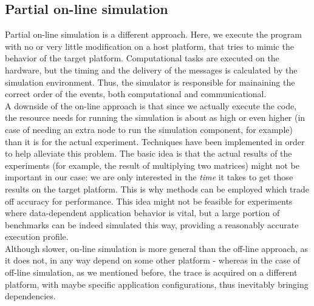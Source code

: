 \subsection{Partial on-line simulation}
Partial on-line simulation is a different approach. Here, we execute
the program with no or very little modification on a host platform,
that tries to mimic the behavior of the target
platform.\cite{csgscq11} Computational tasks are executed on the
hardware, but the timing and the delivery of the messages is
calculated by the simulation environment. Thus, the simulator is
responsible for mainaining the correct order of the events, both
computational and communicational.\cite{bdglmqssv13}\\
A downside of the on-line approach is that since we actually execute
the code, the resource needs for running the simulation is about as
high or even higher (in case of needing an extra node to run the
simulation component, for example) than it is for the actual
experiment. Techniques have been implemented in order to help
alleviate this problem. The basic idea is that
the actual results of the experiments (for example, the result of
multiplying two matrices) might not be important in our case: we are
only interested in the \emph{time} it takes to get those results on
the target platform. This is why methods can be employed which trade
off accuracy for performance. This idea might not be feasible for
experiments where data-dependent application behavior is
vital, but a large portion of benchmarks can be indeed simulated
this way, providing a reasonably accurate execution profile.\\
Although slower, on-line simulation is more general than the off-line
approach, as it does not, in any way depend on some other platform -
whereas in the case of off-line simulation, as we mentioned before,
the trace is acquired on a different platform, with maybe specific
application configurations, thus inevitably bringing dependencies.
